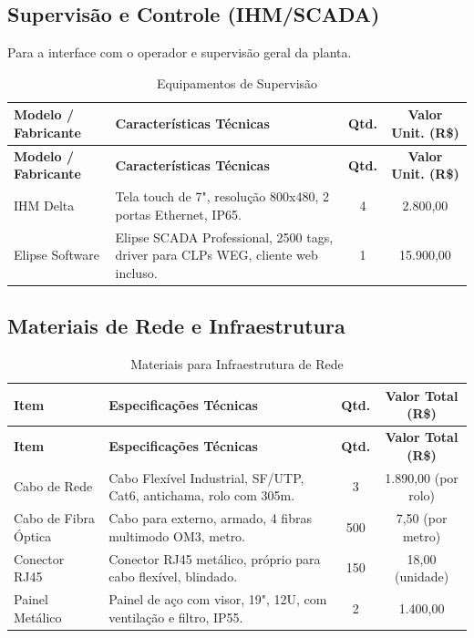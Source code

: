 \documentclass[12pt,a4paper]{article}
\begin{document}
\subsection{Supervisão e Controle (IHM/SCADA)}
Para a interface com o operador e supervisão geral da planta.

\begin{longtable}{@{}p{3.5cm}|p{5cm}|c|c@{}}
\caption{Equipamentos de Supervisão} \\
\toprule
\textbf{Modelo / Fabricante} & \textbf{Características Técnicas} & \textbf{Qtd.} & \textbf{Valor Unit. (R\$)} \\
\midrule
\endfirsthead
\toprule
\textbf{Modelo / Fabricante} & \textbf{Características Técnicas} & \textbf{Qtd.} & \textbf{Valor Unit. (R\$)} \\
\midrule
\endhead
\bottomrule
\endfoot
IHM Delta & Tela touch de 7", resolução 800x480, 2 portas Ethernet, IP65. & 4 & 2.800,00 \\
\midrule
Elipse Software & Elipse SCADA Professional, 2500 tags, driver para CLPs WEG, cliente web incluso. & 1 & 15.900,00 \\
\bottomrule
\end{longtable}

\subsection{Materiais de Rede e Infraestrutura}

\begin{longtable}{@{}p{3.5cm}|p{5cm}|c|c@{}}
\caption{Materiais para Infraestrutura de Rede} \\
\toprule
\textbf{Item} & \textbf{Especificações Técnicas} & \textbf{Qtd.} & \textbf{Valor Total (R\$)} \\
\midrule
\endfirsthead
\toprule
\textbf{Item} & \textbf{Especificações Técnicas} & \textbf{Qtd.} & \textbf{Valor Total (R\$)} \\
\midrule
\endhead
\bottomrule
\endfoot
Cabo de Rede & Cabo Flexível Industrial, SF/UTP, Cat6, antichama, rolo com 305m. & 3 & 1.890,00 (por rolo) \\
\midrule
Cabo de Fibra Óptica & Cabo para externo, armado, 4 fibras multimodo OM3, metro. & 500 & 7,50 (por metro) \\
\midrule
Conector RJ45 & Conector RJ45 metálico, próprio para cabo flexível, blindado. & 150 & 18,00 (unidade) \\
\midrule
Painel Metálico & Painel de aço com visor, 19", 12U, com ventilação e filtro, IP55. & 2 & 1.400,00 \\
\bottomrule
\end{longtable}
\end{document}
